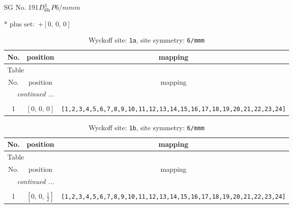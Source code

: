 \documentclass[fleqn,8pt]{jsarticle}
\begin{document}
\setcounter{MaxMatrixCols}{32}

\renewcommand{\tablename}{Table~}
\renewcommand{\figurename}{Figure~}
\begin{center}
\LARGE
SG No. 191\quad$D_{\rm 6h}^{1}$\quad$P6/mmm$\quad[ hexagonal ]
\end{center}
* plus set:\,\,\,$+\left[ 0,\, 0,\, 0 \right]$
\renewcommand{\arraystretch}{1.2}
\begin{longtable}{ccc}
\caption{Wyckoff site: {\tt 1a}, site symmetry: {\tt 6/mmm}}
 \\
 \hline \hline
No. & position & mapping \\ \hline \endfirsthead

\multicolumn{2}{l}{\tablename\ \thetable{}} \\
 \hline \hline
No. & position & mapping \\ \hline \endhead

 \hline \hline
\multicolumn{2}{r}{\footnotesize\it continued ...} \\ \endfoot

 \hline \hline
\multicolumn{2}{r}{} \\ \endlastfoot

1 & $\left[ 0,\, 0,\, 0 \right]$ & {\tt [1,2,3,4,5,6,7,8,9,10,11,12,13,14,15,16,17,18,19,20,21,22,23,24]} \\
\end{longtable}
\renewcommand{\arraystretch}{1.2}
\begin{longtable}{ccc}
\caption{Wyckoff site: {\tt 1b}, site symmetry: {\tt 6/mmm}}
 \\
 \hline \hline
No. & position & mapping \\ \hline \endfirsthead

\multicolumn{2}{l}{\tablename\ \thetable{}} \\
 \hline \hline
No. & position & mapping \\ \hline \endhead

 \hline \hline
\multicolumn{2}{r}{\footnotesize\it continued ...} \\ \endfoot

 \hline \hline
\multicolumn{2}{r}{} \\ \endlastfoot

1 & $\left[ 0,\, 0,\, \frac{1}{2} \right]$ & {\tt [1,2,3,4,5,6,7,8,9,10,11,12,13,14,15,16,17,18,19,20,21,22,23,24]} \\
\end{longtable}
\renewcommand{\arraystretch}{1.2}
\end{document}
